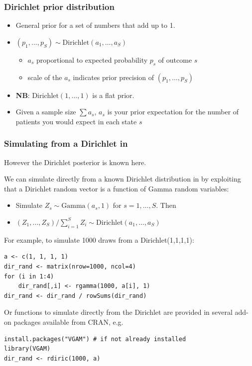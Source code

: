 \begin{frame}

\frametitle{Dirichlet prior distribution}

\begin{itemize}
\item General prior for a set of numbers that add up to 1. 
\item[] $(p_1, \ldots, p_S) \sim \mbox{Dirichlet}(a_1, \ldots, a_S)$
\begin{itemize}
\item $a_s$ proportional to \alert{expected} probability $p_s$ of outcome $s$
\item scale of the $a_s$ indicates prior \alert{precision} of $(p_1, \ldots, p_S)$
\end{itemize}

\vspace{10pt}
\item \textbf{NB}: $\mbox{Dirichlet} (1,\ldots, 1)$ is a flat prior.
\item Given a sample size $\sum a_s$, $a_s$ is your prior expectation for the number
of patients you would expect in each state $s$
\end{itemize}

\end{frame}


\begin{frame}[fragile]

  \frametitle{Simulating from a Dirichlet in \R}

  However the Dirichlet posterior is known here. 

  We can simulate directly from a known Dirichlet distribution in \R by
  exploiting that a Dirichlet random vector is a function of Gamma
  random variables:
  \begin{itemize}
  \item Simulate $Z_s \sim \mbox{Gamma}(a_s, 1)$ for $s=1, \ldots, S$. Then
  \item $(Z_1, \ldots,  Z_S) / \sum_{i=1}^S Z_i \sim \mbox{Dirichlet} (a_1,\ldots,a_S)$
  \end{itemize}

  \pause
  
  For example, to simulate 1000 draws from a Dirichlet(1,1,1,1):

  {\footnotesize \olive
\begin{verbatim}
a <- c(1, 1, 1, 1)
dir_rand <- matrix(nrow=1000, ncol=4)
for (i in 1:4)
    dir_rand[,i] <- rgamma(1000, a[i], 1)
dir_rand <- dir_rand / rowSums(dir_rand)
\end{verbatim}
  }

  \pause
  
  Or functions to simulate directly from the Dirichlet are provided in several \R add-on packages available from CRAN, e.g.

  {\footnotesize \olive
\begin{verbatim}
install.packages("VGAM") # if not already installed
library(VGAM)
dir_rand <- rdiric(1000, a)
\end{verbatim}
}
  
\end{frame}



